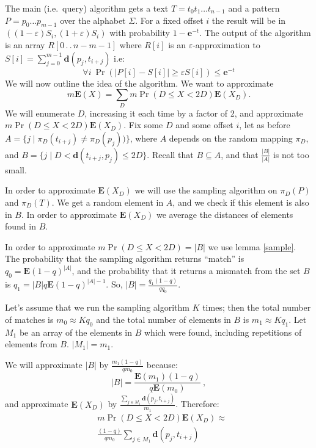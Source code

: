 \documentclass[11pt]{article}
\newcommand{\ldotdot}{\,.\,.\,}
\newcommand{\be}{\begin{equation}}
\newcommand{\ee}{\end{equation}}
\newcommand{\envert}[1]{\left\lvert#1\right\rvert}
\let\abs=\envert
\newcommand{\bfE}{\textbf{E}}
\newcommand{\bfe}{\textbf{e}}
\newcommand{\dist}{\textbf{d}}
\begin{document}
The main (i.e.\ query) algorithm gets a text $T=t_0t_1\ldots
t_{n-1}$ and a pattern $P=p_0\ldots p_{m-1}$ over the alphabet
$\Sigma$. For a fixed offset $i$ the result will be in
$((1-\varepsilon)S_i,(1+\varepsilon)S_i)$ with probability
$1-\bfe^{-t}$. The output of the algorithm is an array $R[0 \ldotdot
n-m-1]$ where $R[i]$ is an $\varepsilon$-approximation to
$S[i]=\sum_{j=0}^{m-1}\dist(p_j,t_{i+j})$ i.e:
\begin{equation}
\forall i\  \Pr(\abs{P[i]-S[i]}\geq \varepsilon S[i])\leq \bfe^{-t}
\end{equation}
We will now outline the idea of the algorithm. We want to approximate
$$m\bfE(X)=\sum_D m\Pr(D\leq X <2D)\bfE(X_D).$$
We will enumerate $D$, increasing it each time by a factor of 2,
and approximate $m\Pr(D\leq X <2D)\bfE(X_D)$. Fix some $D$ and
some offset $i$, let as before  $A=\{j\mid \pi_D(t_{i+j})\neq
\pi_D(p_j)) \}$, where $A$ depends on the random mapping $\pi_D$,
and $B=\{j\mid D<\dist(t_{i+j},p_j)\leq 2D \}$. Recall that $B
\subseteq A$, and that $\frac{\abs{B}}{ \abs{A}}$ is not too
small.

In order to approximate $\bfE(X_D)$ we will use the sampling
algorithm on $\pi_D(P)$ and $\pi_D(T)$. We get a random element in
$A$, and we check if this element is also in $B$. In order to
approximate $\bfE(X_D)$ we average the distances of elements found
in $B$.

In order to approximate $m\Pr(D\leq X <2D)=\abs{B}$ we use lemma
\ref{sample}. The probability that the sampling algorithm returns
``match'' is $q_0=\bfE(1-q)^{\abs{A}}$, and the probability that
it returns a mismatch from the set $B$ is
$q_1=\abs{B}q\bfE(1-q)^{\abs{A}-1}$. So,
$\abs{B}=\frac{q_1(1-q)}{qq_0}$.

Let's assume that we run the sampling algorithm $K$ times; then the total
number of matches is $m_0 \approx K q_0$ and the total number of
elements in $B$ is $m_1 \approx K q_1$. Let $M_1$ be an array of the
elements in $B$ which were found, including repetitions of elements
from $B$. $\abs{M_1} = m_1$.

We will approximate $\abs{B}$ by $\frac{m_1 (1-q)}{q m_0} $ because:
\be \label {1eq}
\abs{B} = \frac{\bfE(m_1) (1-q)}{q \bfE(m_0)}\ ,
\ee
 and approximate $\bfE(X_D)$ by $\frac{\sum_{j\in M_1}\dist(p_j,t_{i+j})
}{m_1}$. Therefore:
\begin{equation}
\begin{split}
&m\Pr(D\leq X <2D)\bfE(X_D) \approx\\
&\frac{(1-q)}{qm_0}\sum_{j\in M_1}\dist(p_j,t_{i+j})
\end{split}
\end{equation}
\end{document}
